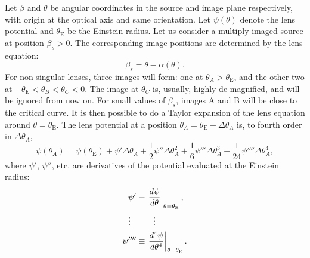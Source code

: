 \documentclass[usenatbib]{mnras}
\def\psii{\psi'}
\def\psiii{\psi''}
\def\psiiii{\psi'''}
\def\psiiv{\psi''''}
\def\tein{\theta_{\mathrm{E}}}
\begin{document}
Let $\beta$ and $\theta$ be angular coordinates in the source and image plane respectively, with origin at the optical axis and same orientation.
Let $\psi(\theta)$ denote the lens potential and $\tein$ be the Einstein radius.
Let us consider a multiply-imaged source at position $\beta_s>0$.
The corresponding image positions are determined by the lens equation:
\begin{equation}\label{eq:lensequation}
\beta_s = \theta  - \alpha(\theta).
\end{equation}
For non-singular lenses, three images will form: one at $\theta_A > \tein$, and the other two at $-\tein < \theta_B < \theta_C < 0$.
The image at $\theta_C$ is, usually, highly de-magnified, and will be ignored from now on.
For small values of $\beta_s$, images A and B will be close to the critical curve. It is then possible to do a Taylor expansion of the lens equation around $\theta=\tein$.
The lens potential at a position $\theta_A = \tein + \Delta\theta_A$ is, to fourth order in $\Delta\theta_A$,
\begin{equation}\label{eq:potA}
\psi(\theta_A) = \psi(\tein) + \psii \Delta\theta_A + \frac12 \psiii \Delta\theta_A^2 + \frac16 \psiiii \Delta\theta_A ^ 3 + \frac{1}{24}\psiiv\Delta\theta_A^4,
\end{equation}
where $\psii$, $\psiii$, etc. are derivatives of the potential evaluated at the Einstein radius:
\begin{align}
\psii &\equiv \left. \frac{d\psi}{d\theta} \right\rvert_{\theta=\tein}, \nonumber \\
\vdotswithin{\psiiv} & \vdotswithin{\left. \frac{d^4\psi}{d\theta^4} \right\rvert_{\theta=\tein}} \\
\psiiv &\equiv \left. \frac{d^4\psi}{d\theta^4} \right\rvert_{\theta=\tein} \nonumber.
\end{align}
\end{document}
